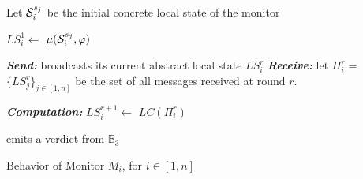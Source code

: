 

\begin{algorithm}[H]

\small
{}
Let $\mathcal{S}_i^{s_j}$ be the initial concrete local state of the monitor  

$LS_i^1 \gets$ $\mu (\mathcal{S}_i^{s_j}, \varphi)$  

  {  
{\em \textbf{Send:}}  broadcasts its current abstract local state $LS_i^r$ 
\label{line:send} 
{\em \textbf{Receive:}} let $\Pi_i^r =$ $\{ LS_j^r\}_{j \in [1, n]}$ be the set of all messages received at round $r$. 


{\it \textbf{Computation:}}  $LS_i^{r+1} \gets$   $LC(\Pi_i^r)$  \label{line:computation} 

}
emits a verdict from $\mathbb{B}_3$ 
\label{line:emit}
\caption{Behavior of Monitor $M_i$, for $i\in [1, n]$}
\label{alg:localmonalgo}
 \end{algorithm}










